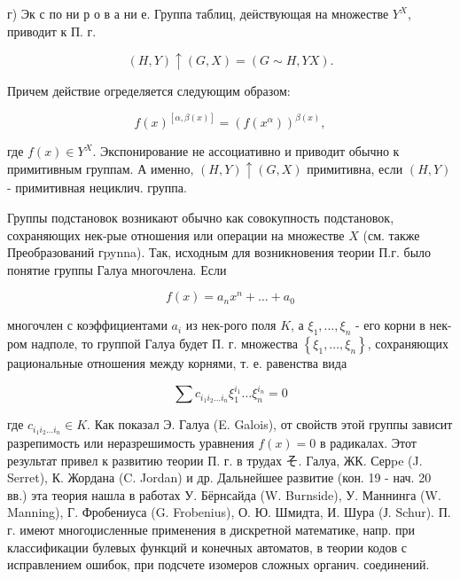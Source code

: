 \documentclass[10pt]{article}
\begin{document}
г) Эк с по ни р о в а ни е. Группа таблиц, деӥствующая на множестве $Y^{X}$, приводит к П. г.



\[

(H, Y) \uparrow(G, X)=(G \sim H, Y X) .

\]



Причем действие огределяется следующим образом:



\[

f(x)^{[\alpha, \beta(x)]}=\left(f\left(x^{\alpha}\right)\right)^{\beta(x)},

\]



где $f(x) \in Y^{X}$. Экспонирование не ассоциативно и приводит обычно к примитивным группам. А именно, $(H, Y) \uparrow(G, X)$ примитивна, если $(H, Y)$ - примитивная нециклич. группа.



Группы подстановок возникают обычно как совокупность подстановок, сохраняющих нек-рые отношения или операции на множестве $X$ (см. также Преобразований гpynna). Так, исходным для возникновения теории П.г. было понятие группы Галуа многочлена. Если



\[

f(x)=a_{n} x^{n}+\ldots+a_{0}

\]



многочлен с коэффициентами $a_{i}$ из нек-рого поля $K$, а $\xi_{1}, \ldots, \xi_{n}$ - его корни в нек-ром надполе, то группой Галуа будет П. г. множества $\left\{\xi_{1}, \ldots, \xi_{n}\right\}$, сохраняющих рациональные отношения между корнями, т. е. равенства вида



\[

\sum c_{i_{1} i_{2} \ldots i_{n}} \xi_{1}^{i_{1}} \ldots \xi_{n}^{i_{n}}=0

\]



где $c_{i_{1} i_{2} \ldots i_{n}} \in K$. Как показал Э. Галуа (E. Galois), от свойств этой группы зависит разрепимость или неразрешимость уравнения $f(x)=0$ в радикалах. Этот результат привел к развитию теории П. г. в трудах そ. Галуа, ЖК. Серpe (J. Serret), К. Жордана (C. Jordan) и др. Дальнейшее развитие (кон. 19 - нач. 20 вв.) эта теория нашла в работах У. Бёрнсайда (W. Burnside), У. Маннинга (W. Manning), Г. Фробениуса (G. Frobenius), О. Ю. Шмидта, И. Шура (Ј. Schur). П. г. имеют многоџисленные применения в дискретной математике, напр. при классификации булевых функций и конечных автоматов, в теории кодов с исправлением ошибок, при подсчете изомеров сложных органич. соединений.
\end{document}

